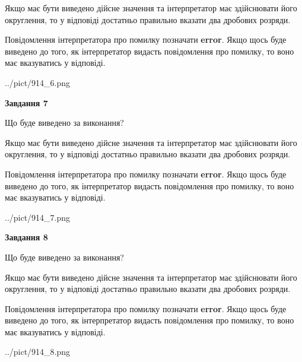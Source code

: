 \documentclass[12pt, ukrainian]{article}
\begin{document}
{\begin {Large}
Якщо має бути виведено дійсне значення та інтерпретатор має здійснювати його округлення, 
то у відповіді достатньо правильно вказати два дробових розряди.

Повідомлення інтерпретатора про помилку позначати \textbf{error}.
Якщо щось буде виведено до того, як інтерпретатор видасть повідомлення про помилку, 
то воно має вказуватись у відповіді. \par

\begin{center}
	{../pict/914_6.png}
\end{center}
\newpage

{\begin {center}\textbf{Завдання 7}\end {center}}\par
Що буде виведено за виконання? \par

Якщо має бути виведено дійсне значення та інтерпретатор має здійснювати його округлення, 
то у відповіді достатньо правильно вказати два дробових розряди.

Повідомлення інтерпретатора про помилку позначати \textbf{error}.
Якщо щось буде виведено до того, як інтерпретатор видасть повідомлення про помилку, 
то воно має вказуватись у відповіді. \par

\begin{center}
	{../pict/914_7.png}
\end{center}
\newpage

{\begin {center}\textbf{Завдання 8}\end {center}}\par
Що буде виведено за виконання? \par

Якщо має бути виведено дійсне значення та інтерпретатор має здійснювати його округлення, 
то у відповіді достатньо правильно вказати два дробових розряди.

Повідомлення інтерпретатора про помилку позначати \textbf{error}.
Якщо щось буде виведено до того, як інтерпретатор видасть повідомлення про помилку, 
то воно має вказуватись у відповіді. \par

\begin{center}
	{../pict/914_8.png}
\end{center}
\newpage


\end{Large}}
\end{document}
